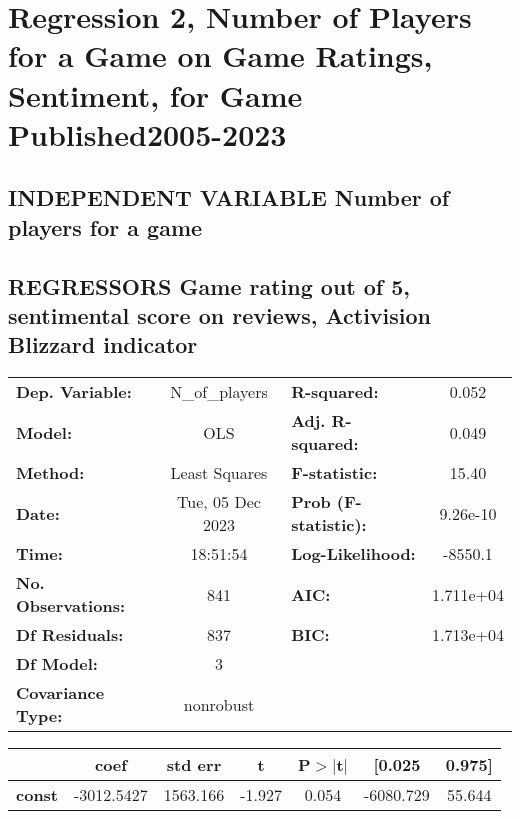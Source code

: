 \documentclass{report}
\begin{document}
\section*{Regression 2, Number of Players for a Game on Game Ratings, Sentiment, for Game Published2005-2023}\bigskip
\subsection*{INDEPENDENT VARIABLE Number of players for a game}\bigskip
\subsection*{REGRESSORS Game rating out of 5, sentimental score on reviews, Activision Blizzard indicator}\bigskip
\begin{center}
\begin{tabular}{lclc}
\toprule
\textbf{Dep. Variable:}    &  N\_of\_players  & \textbf{  R-squared:         } &     0.052   \\
\textbf{Model:}            &       OLS        & \textbf{  Adj. R-squared:    } &     0.049   \\
\textbf{Method:}           &  Least Squares   & \textbf{  F-statistic:       } &     15.40   \\
\textbf{Date:}             & Tue, 05 Dec 2023 & \textbf{  Prob (F-statistic):} &  9.26e-10   \\
\textbf{Time:}             &     18:51:54     & \textbf{  Log-Likelihood:    } &   -8550.1   \\
\textbf{No. Observations:} &         841      & \textbf{  AIC:               } & 1.711e+04   \\
\textbf{Df Residuals:}     &         837      & \textbf{  BIC:               } & 1.713e+04   \\
\textbf{Df Model:}         &           3      & \textbf{                     } &             \\
\textbf{Covariance Type:}  &    nonrobust     & \textbf{                     } &             \\
\bottomrule
\end{tabular}
\begin{tabular}{lcccccc}
                           & \textbf{coef} & \textbf{std err} & \textbf{t} & \textbf{P$> |$t$|$} & \textbf{[0.025} & \textbf{0.975]}  \\
\midrule
\textbf{const}             &   -3012.5427  &     1563.166     &    -1.927  &         0.054        &    -6080.729    &       55.644     \\

\end{tabular}
\end{center}
\end{document}
